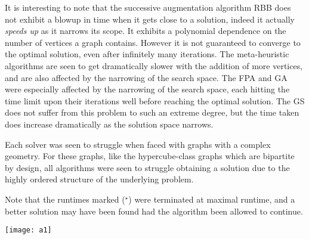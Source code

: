 It is interesting to note that the successive augmentation algorithm RBB does not exhibit a blowup in time when it gets close to a solution, indeed it actually \emph{speeds up} as it narrows its scope. It exhibits a polynomial dependence on the number of vertices a graph contains. However it is not guaranteed to converge to the optimal solution, even after infinitely many iterations. The meta-heuristic algorithms are seen to get dramatically slower with the addition of more vertices, and are also affected by the narrowing of the search space. The FPA and GA were especially affected by the narrowing of the search space, each hitting the time limit upon their iterations well before reaching the optimal solution. The GS does not suffer from this problem to such an extreme degree, but the time taken does increase dramatically as the solution space narrows.

Each solver was seen to struggle when faced with graphs with a complex geometry. For these graphs, like the hypercube-class graphs which are bipartite by design, all algorithms were seen to struggle obtaining a solution due to the highly ordered structure of the underlying problem.

Note that the runtimes marked ($^\star$) were terminated at maximal runtime, and a better solution may have been found had the algorithm been allowed to continue.

\texttt{[image: a1]}